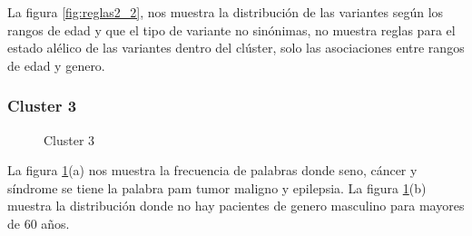 La figura \ref{fig:reglas2_2}, nos muestra la distribución de las variantes según los rangos de edad y que el tipo de variante no sinónimas, no muestra reglas para el estado alélico de las variantes dentro del clúster, solo las asociaciones entre rangos de edad y genero. 

\subsubsection*{Cluster 3}

\begin{figure}[h]
	\centering
	\caption{Cluster 3} \label{fig:c3}
\end{figure}

La figura \ref{fig:c3}(a) nos muestra la frecuencia de palabras donde seno, cáncer y síndrome se tiene la palabra pam tumor maligno y epilepsia. La figura \ref{fig:c3}(b) muestra la distribución donde no hay pacientes de genero masculino para mayores de 60 años.  

